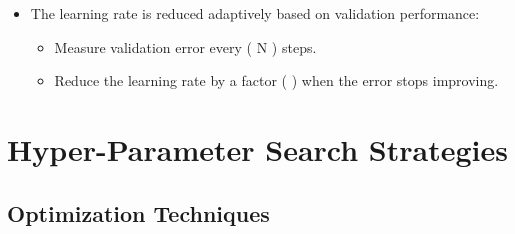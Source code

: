 \documentclass[
  letterpaper,
  DIV=11,
  numbers=noendperiod]{scrreprt}
\providecommand{\tightlist}{%
  \setlength{\itemsep}{0pt}\setlength{\parskip}{0pt}}\usepackage{longtable,booktabs,array}
\begin{document}
\begin{enumerate}
  \begin{itemize}
  \tightlist
  \item
    The learning rate is reduced adaptively based on validation
    performance:

    \begin{itemize}
    \tightlist
    \item
      Measure validation error every ( N ) steps.\\
    \item
      Reduce the learning rate by a factor ( \lambda ) when the error
      stops improving.
    \end{itemize}
  \end{itemize}
\end{enumerate}

\section{Hyper-Parameter Search
Strategies}\label{hyper-parameter-search-strategies}

\subsection{Optimization Techniques}\label{optimization-techniques}
\end{document}
